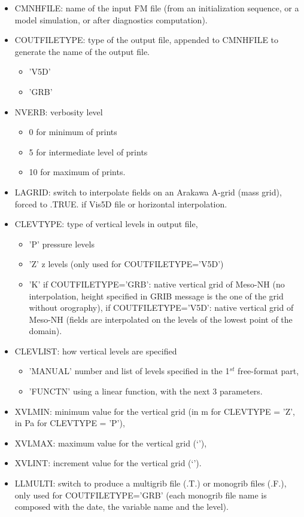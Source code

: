 \begin{enumerate}
\begin{itemize}
\item CMNHFILE: name of the input FM file (from an initialization sequence, or
a model simulation, or after diagnostics computation).
\item COUTFILETYPE: type of the output file, appended
to CMNHFILE to generate the name of the output file.
\begin{itemize}
\item 'V5D'
\item 'GRB'
\end{itemize}
\item NVERB: verbosity level 
\begin{itemize}
\item  0 for minimum of prints
\item  5 for intermediate level of prints
\item  10 for maximum of prints.
\end{itemize}
\item LAGRID: switch to interpolate fields on an Arakawa A-grid (mass grid),
\subitem forced to .TRUE. if Vis5D file or horizontal interpolation.
\item CLEVTYPE: type of vertical levels in output file,
\begin{itemize}
\item 'P' pressure levels
\item 'Z' z levels (only used for COUTFILETYPE='V5D')
\item 'K' 
\subitem if COUTFILETYPE='GRB': native vertical grid of Meso-NH (no
interpolation, height specified in GRIB message is the one of the grid 
without orography),
\subitem if COUTFILETYPE='V5D': native vertical grid of Meso-NH (fields are
interpolated on the levels of the lowest point of the domain).
\end{itemize}
\item CLEVLIST: how vertical levels are specified
\begin{itemize}
\item 'MANUAL' number and list of levels specified in the 1$^{st}$ free-format
part,
\item 'FUNCTN' using a linear function, with the next 3 parameters. 
\end{itemize}
\item XVLMIN: minimum value for the vertical grid 
\subitem (in m for CLEVTYPE = 'Z', in Pa for CLEVTYPE = 'P'),
\item XVLMAX: maximum value for the vertical grid (`'),
\item XVLINT: increment value for the vertical grid (`').
\item LLMULTI: switch to produce a multigrib file (.T.) or monogrib files (.F.),
only used for COUTFILETYPE='GRB' (each monogrib file name is composed with the
date, the variable name and the level).


\end{itemize}
\end{enumerate}
